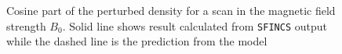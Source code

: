 \documentclass[12pt]{article}
\begin{document}
  \begin{figure}[H]
 \setlength\figureheight{0.3\textheight}
 \setlength{}
    \centering
        
       \caption{Cosine part of the perturbed density for a scan in the magnetic field strength $B_0$. Solid line shows result calculated from \texttt{SFINCS} output while the dashed line is the prediction from the model}
                  \label{fig:2}
  \end{figure}  




 

\newpage
\end{document}
